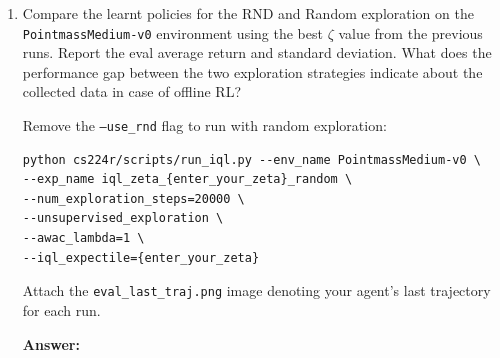 \documentclass[12pt]{article}
\newcommand{\answer}[1]{{\bf \color{red}Answer:\\ #1}}
\begin{document}
\begin{enumerate}
\begin{tcolorbox}[width=\linewidth, sharp corners=all, colback=white!95!black]
\begin{verbatim}
python cs224r/scripts/run_iql.py --env_name PointmassEasy-v0 \
--exp_name iql_zeta_{enter_your_zeta}_rnd --use_rnd \
--num_exploration_steps=20000 \
--unsupervised_exploration \
--awac_lambda=1 \
--iql_expectile={enter_your_zeta}
\end{verbatim}
\end{tcolorbox}

\noindent

\answer{

}
\item Compare the learnt policies for the RND and Random exploration on the \\ \texttt{PointmassMedium-v0} environment using the best $\zeta$ value from the previous runs. Report the eval average return and standard deviation. What does the performance gap between the two exploration strategies indicate about the collected data in case of offline RL?


Remove the \texttt{--use\_rnd} flag to run with random exploration:

\begin{tcolorbox}[width=\linewidth, sharp corners=all, colback=white!95!black]
\begin{verbatim}
python cs224r/scripts/run_iql.py --env_name PointmassMedium-v0 \
--exp_name iql_zeta_{enter_your_zeta}_random \
--num_exploration_steps=20000 \
--unsupervised_exploration \
--awac_lambda=1 \
--iql_expectile={enter_your_zeta}
\end{verbatim}
\end{tcolorbox}

Attach the \texttt{eval\_last\_traj.png} image denoting your agent's last trajectory for each run.

\answer{
}

\end{enumerate}

\newpage
\end{document}
